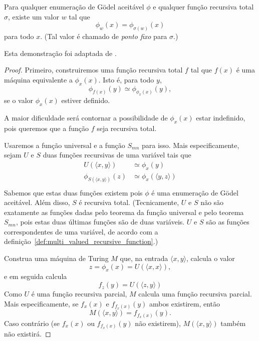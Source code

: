 \begin{lemma}
    Para qualquer enumeração de Gödel aceitável $\phi$
    e qualquer função recursiva total $\sigma$,
    existe um valor $w$ tal que
    \begin{equation*}
        \phi_w(x) = \phi_{\sigma(w)}(x)
    \end{equation*}
    para todo $x$.
    (Tal valor é chamado de \emph{ponto fixo} para $\sigma$.)
    \label{thm:recursion}
\end{lemma}

Esta demonstração foi adaptada de \cite[p.~208]{HopcroftUllman1979}.

\begin{proof}
    Primeiro,
    construiremos uma função recursiva total $f$
    tal que $f(x)$ é uma máquina equivalente a $\phi_x(x)$.
    Isto é,
    para todo $y$,
    \begin{equation}
        \phi_{f(x)}(y) \simeq \phi_{\phi_x(x)}(y),
        \label{eq:diagonal_M}
    \end{equation}
    se o valor $\phi_x(x)$ estiver definido.

    A maior dificuldade será contornar a possibilidade de $\phi_x(x)$ estar indefinido,
    pois queremos que a função $f$ seja recursiva total.

    Usaremos a função universal e a função $S_{mn}$ para isso.
    Mais especificamente,
    sejam $U$ e $S$ duas funções recursivas de uma variável tais que
    \begin{align*}
        U(\langle x, y \rangle) &\simeq \phi_x(y) \\
        \phi_{S(\langle x, y \rangle)}(z) &\simeq \phi_x(\langle y, z \rangle) \\
    \end{align*}
    Sabemos que estas duas funções existem
    pois $\phi$ é uma enumeração de Gödel aceitável.
    Além disso, $S$ é recursiva total.
    (Tecnicamente, $U$ e $S$ não são exatamente as funções
    dadas pelo teorema da função universal e pelo teorema $S_{mn}$,
    pois estas duas últimas funções são de duas variáveis.
    $U$ e $S$ são as funções correspondentes de uma variável,
    de acordo com a definição~\ref{def:multi_valued_recursive_function}.)

    Construa uma máquina de Turing $M$ que,
    na entrada $\langle x, y \rangle$,
    calcula o valor
    \begin{equation}
        z = \phi_x(x) = U(\langle x, x \rangle),
        \label{eq:f_x_x}
    \end{equation}
    e em seguida calcula
    \begin{equation}
        f_z(y) = U(\langle z, y \rangle)
        \label{eq:f_f_x_x_y}
    \end{equation}
    Como $U$ é uma função recursiva parcial,
    $M$ calcula uma função recursiva parcial.
    Mais especificamente,
    se $f_x(x)$ e $f_{f_x(x)}(y)$ ambos existirem,
    então
    \begin{equation*}
        M(\langle x, y \rangle) = f_{f_x(x)}(y).
    \end{equation*}
    Caso contrário (se $f_x(x)$ ou $f_{f_x(x)}(y)$ não existirem),
    $M(\langle x, y \rangle)$ também não existirá.


\end{proof}
